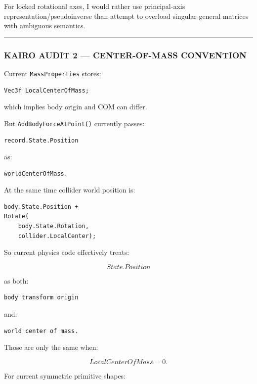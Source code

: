 For locked rotational axes, I would rather use principal-axis representation/pseudoinverse than attempt to overload singular general matrices with ambiguous semantics.

\begin{center}\rule{0.5\linewidth}{0.5pt}\end{center}

\subsubsection{KAIRO AUDIT 2 --- CENTER-OF-MASS CONVENTION}\label{kairo-audit-2-center-of-mass-convention}

Current \texttt{MassProperties} stores:

\begin{verbatim}
Vec3f LocalCenterOfMass;
\end{verbatim}

which implies body origin and COM can differ.

But \texttt{AddBodyForceAtPoint()} currently passes:

\begin{verbatim}
record.State.Position
\end{verbatim}

as:

\begin{verbatim}
worldCenterOfMass.
\end{verbatim}

At the same time collider world position is:

\begin{verbatim}
body.State.Position +
Rotate(
    body.State.Rotation,
    collider.LocalCenter);
\end{verbatim}

So current physics code effectively treats:

\[
State.Position
\]

as both:

\begin{verbatim}
body transform origin
\end{verbatim}

and:

\begin{verbatim}
world center of mass.
\end{verbatim}

Those are only the same when:

\[
LocalCenterOfMass=0.
\]

For current symmetric primitive shapes:

